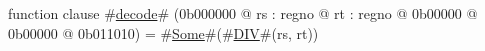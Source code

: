 function clause #\hyperref[zdecode]{decode}# (0b000000 @ rs : regno @ rt : regno @ 0b00000 @ 0b00000 @ 0b011010) =
  #\hyperref[zSome]{Some}#(#\hyperref[zDIV]{DIV}#(rs, rt))
